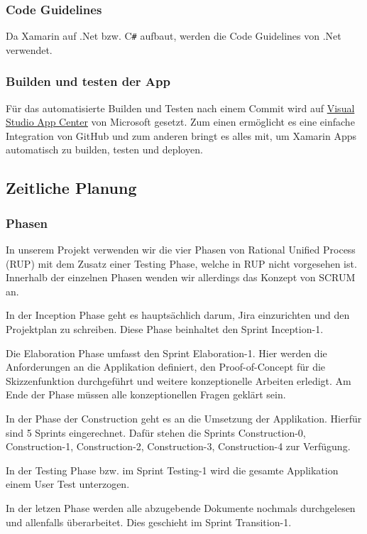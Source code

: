 \subsubsection*{Code Guidelines}
Da Xamarin auf .Net bzw. C\texttt{\#} aufbaut, werden die Code Guidelines von .Net verwendet. \cite{guidelines-DotNet}

\subsubsection*{Builden und testen der App}
Für das automatisierte Builden und Testen nach einem Commit wird auf \href{https://appcenter.ms/orgs/BrainingOutOfBox/apps/BrainingOutOfBox-App}{Visual Studio App Center} von Microsoft gesetzt. Zum einen ermöglicht es eine einfache Integration von GitHub und zum anderen bringt es alles mit, um Xamarin Apps automatisch zu builden, testen und deployen. 

\subsection{Zeitliche Planung}

\subsubsection*{Phasen}
In unserem Projekt verwenden wir die vier Phasen von Rational Unified Process (RUP) \cite{RUP} mit dem Zusatz einer Testing Phase, welche in RUP nicht vorgesehen ist. Innerhalb der einzelnen Phasen wenden wir allerdings das Konzept von SCRUM \cite{SCRUM} an.  
\begin{description}[leftmargin=!,labelwidth=\widthof{\bfseries Construction Phase}]
	\item [Inception Phase] In der Inception Phase geht es hauptsächlich darum, Jira einzurichten und den Projektplan zu schreiben. Diese Phase beinhaltet den Sprint Inception-1.
	\item [Elaboration Phase] Die Elaboration Phase umfasst den Sprint Elaboration-1. Hier werden die Anforderungen an die Applikation definiert, den Proof-of-Concept für die Skizzenfunktion durchgeführt und weitere konzeptionelle Arbeiten erledigt. Am Ende der Phase müssen alle konzeptionellen Fragen geklärt sein. 
	\item [Construction Phase] In der Phase der Construction geht es an die Umsetzung der Applikation. Hierfür sind 5 Sprints eingerechnet. Dafür stehen die Sprints Construction-0, Construction-1, Construction-2, Con\-struc\-tion-3, Construction-4 zur Verfügung.
	\item [Testing] In der Testing Phase bzw. im Sprint Testing-1 wird die gesamte Applikation einem User Test unterzogen.
	\item [Transition Phase] In der letzen Phase werden alle abzugebende Dokumente nochmals durchgelesen und allenfalls überarbeitet. Dies geschieht im Sprint Transition-1.
\end{description}

